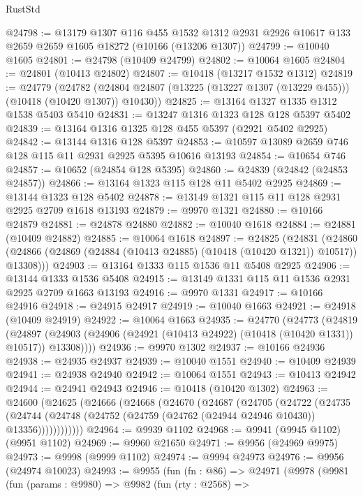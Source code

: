 \begin{lexlean}{RustStd}
\begin{coremodule}
@24798 := @13179
    @1307
    @116
    @455
    @1532
    @1312
    @2931
    @2926
    @10617
    @133
    @2659
    @2659
    @1605
    @18272
    (@10166 (@13206 @1307))
@24799 := @10040 @1605
@24801 := @24798 (@10409 @24799)
@24802 := @10064 @1605
@24804 := @24801 (@10413 @24802)
@24807 := @10418 (@13217 @1532 @1312)
@24819 := @24779
    (@24782 (@24804 @24807 (@13225 (@13227 @1307 (@13229 @455))) (@10418 (@10420 @1307)) @10430))
@24825 := @13164 @1327 @1335 @1312 @1538 @5403 @5410
@24831 := @13247 @1316 @1323 @128 @128 @5397 @5402
@24839 := @13164 @1316 @1325 @128 @455 @5397 (@2921 @5402 @2925)
@24842 := @13144 @1316 @128 @5397
@24853 := @10597 @13089 @2659 @746 @128 @115 @11 @2931 @2925 @5395 @10616 @13193
@24854 := @10654 @746
@24857 := @10652 (@24854 @128 @5395)
@24860 := @24839 (@24842 (@24853 @24857))
@24866 := @13164 @1323 @115 @128 @11 @5402 @2925
@24869 := @13144 @1323 @128 @5402
@24878 := @13149 @1321 @115 @11 @128 @2931 @2925 @2709 @1618 @13193
@24879 := @9970 @1321
@24880 := @10166 @24879
@24881 := @24878 @24880
@24882 := @10040 @1618
@24884 := @24881 (@10409 @24882)
@24885 := @10064 @1618
@24897 := @24825
    (@24831
      (@24860 (@24866 (@24869 (@24884 (@10413 @24885) (@10418 (@10420 @1321)) @10517)) @13308)))
@24903 := @13164 @1333 @115 @1536 @11 @5408 @2925
@24906 := @13144 @1333 @1536 @5408
@24915 := @13149 @1331 @115 @11 @1536 @2931 @2925 @2709 @1663 @13193
@24916 := @9970 @1331
@24917 := @10166 @24916
@24918 := @24915 @24917
@24919 := @10040 @1663
@24921 := @24918 (@10409 @24919)
@24922 := @10064 @1663
@24935 := @24770
    (@24773
      (@24819
        (@24897 (@24903 (@24906 (@24921 (@10413 @24922) (@10418 (@10420 @1331)) @10517)) @13308))))
@24936 := @9970 @1302
@24937 := @10166 @24936
@24938 := @24935 @24937
@24939 := @10040 @1551
@24940 := @10409 @24939
@24941 := @24938 @24940
@24942 := @10064 @1551
@24943 := @10413 @24942
@24944 := @24941 @24943
@24946 := @10418 (@10420 @1302)
@24963 := @24600
    (@24625
      (@24666
        (@24668
          (@24670
            (@24687
              (@24705
                (@24722
                  (@24735
                    (@24744
                      (@24748 (@24752 (@24759 (@24762 (@24944 @24946 @10430)) @13356))))))))))))
@24964 := @9939 @1102
@24968 := @9941 (@9945 @1102) (@9951 @1102)
@24969 := @9960 @21650
@24971 := @9956 (@24969 @9975)
@24973 := @9998 (@9999 @1102)
@24974 := @9994 @24973
@24976 := @9956 (@24974 @10023)
@24993 := @9955
    (fun (fn : @86) =>
    @24971
      (@9978
        (@9981
          (fun (params : @9980) =>
          @9982
            (fun (rty : @2568) =>

\end{coremodule}
\end{lexlean}
